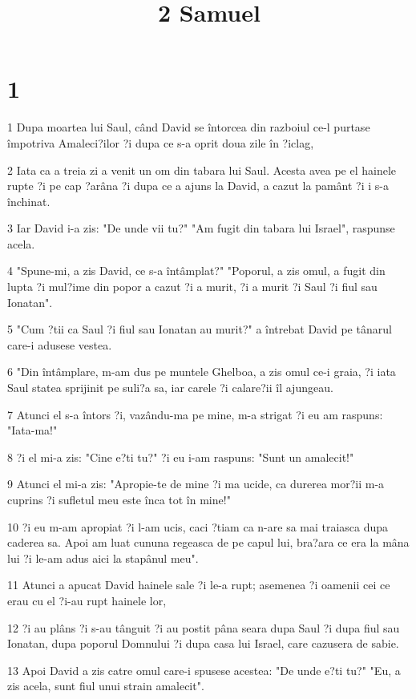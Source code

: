 

\title{2 Samuel}


\chapter{1}

\par 1 Dupa moartea lui Saul, când David se întorcea din razboiul ce-l purtase împotriva Amaleci?ilor ?i dupa ce s-a oprit doua zile în ?iclag,
\par 2 Iata ca a treia zi a venit un om din tabara lui Saul. Acesta avea pe el hainele rupte ?i pe cap ?arâna ?i dupa ce a ajuns la David, a cazut la pamânt ?i i s-a închinat.
\par 3 Iar David i-a zis: "De unde vii tu?" "Am fugit din tabara lui Israel", raspunse acela.
\par 4 "Spune-mi, a zis David, ce s-a întâmplat?" "Poporul, a zis omul, a fugit din lupta ?i mul?ime din popor a cazut ?i a murit, ?i a murit ?i Saul ?i fiul sau Ionatan".
\par 5 "Cum ?tii ca Saul ?i fiul sau Ionatan au murit?" a întrebat David pe tânarul care-i adusese vestea.
\par 6 "Din întâmplare, m-am dus pe muntele Ghelboa, a zis omul ce-i graia, ?i iata Saul statea sprijinit pe suli?a sa, iar carele ?i calare?ii îl ajungeau.
\par 7 Atunci el s-a întors ?i, vazându-ma pe mine, m-a strigat ?i eu am raspuns: "Iata-ma!"
\par 8 ?i el mi-a zis: "Cine e?ti tu?" ?i eu i-am raspuns: "Sunt un amalecit!"
\par 9 Atunci el mi-a zis: "Apropie-te de mine ?i ma ucide, ca durerea mor?ii m-a cuprins ?i sufletul meu este înca tot în mine!"
\par 10 ?i eu m-am apropiat ?i l-am ucis, caci ?tiam ca n-are sa mai traiasca dupa caderea sa. Apoi am luat cununa regeasca de pe capul lui, bra?ara ce era la mâna lui ?i le-am adus aici la stapânul meu".
\par 11 Atunci a apucat David hainele sale ?i le-a rupt; asemenea ?i oamenii cei ce erau cu el ?i-au rupt hainele lor,
\par 12 ?i au plâns ?i s-au tânguit ?i au postit pâna seara dupa Saul ?i dupa fiul sau Ionatan, dupa poporul Domnului ?i dupa casa lui Israel, care cazusera de sabie.
\par 13 Apoi David a zis catre omul care-i spusese acestea: "De unde e?ti tu?" "Eu, a zis acela, sunt fiul unui strain amalecit".
